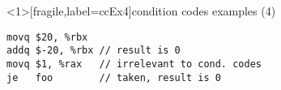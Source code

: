 

\begin{frame}<1>[fragile,label=ccEx4]{condition codes examples (4)}
\begin{lstlisting}[language=myasm]
movq $20, %rbx
addq $-20, %rbx // result is 0
movq $1, %rax   // irrelevant to cond. codes
je   foo        // taken, result is 0
\end{lstlisting}
\end{frame}


